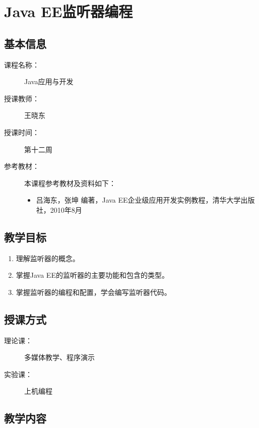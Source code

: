 \chapter{Java EE监听器编程}
\label{chp:JavaEE-listener-programming}

\section*{基本信息}
\sline
\begin{description}
\item[课程名称：] Java应用与开发
\item[授课教师：] 王晓东
\item[授课时间：] 第十二周
\item[参考教材：] 本课程参考教材及资料如下：
  \begin{itemize}
  \item 吕海东，张坤 编著，Java EE企业级应用开发实例教程，清华大学出版社，2010年8月
  \end{itemize}
\end{description}

\section*{教学目标}

\sline

\begin{enumerate}
\item 理解监听器的概念。
\item 掌握Java EE的监听器的主要功能和包含的类型。
\item 掌握监听器的编程和配置，学会编写监听器代码。
\end{enumerate}  

\section*{授课方式}

\sline
\begin{description}
\item[理论课：] 多媒体教学、程序演示
\item[实验课：] 上机编程
\end{description}

\newpage
\section*{教学内容}
\sline

